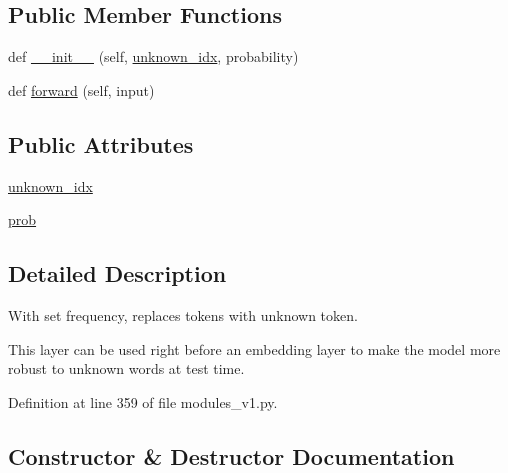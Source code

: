 \subsection*{Public Member Functions}
\begin{DoxyCompactItemize}
\item 
def \hyperlink{classparlai_1_1agents_1_1legacy__agents_1_1seq2seq_1_1modules__v1_1_1UnknownDropout_a7063d1866221608f272c2c6697d4b98b}{\+\_\+\+\_\+init\+\_\+\+\_\+} (self, \hyperlink{classparlai_1_1agents_1_1legacy__agents_1_1seq2seq_1_1modules__v1_1_1UnknownDropout_a7c6fe2c4afa06bf542c36ea9821b243f}{unknown\+\_\+idx}, probability)
\item 
def \hyperlink{classparlai_1_1agents_1_1legacy__agents_1_1seq2seq_1_1modules__v1_1_1UnknownDropout_a4527e73a4211e888db806e4526c0126e}{forward} (self, input)
\end{DoxyCompactItemize}
\subsection*{Public Attributes}
\begin{DoxyCompactItemize}
\item 
\hyperlink{classparlai_1_1agents_1_1legacy__agents_1_1seq2seq_1_1modules__v1_1_1UnknownDropout_a7c6fe2c4afa06bf542c36ea9821b243f}{unknown\+\_\+idx}
\item 
\hyperlink{classparlai_1_1agents_1_1legacy__agents_1_1seq2seq_1_1modules__v1_1_1UnknownDropout_a7d5b061b69c0857aec6dfe3f3f5cd9ed}{prob}
\end{DoxyCompactItemize}


\subsection{Detailed Description}
\begin{DoxyVerb}With set frequency, replaces tokens with unknown token.

This layer can be used right before an embedding layer to make the model
more robust to unknown words at test time.
\end{DoxyVerb}
 

Definition at line 359 of file modules\+\_\+v1.\+py.



\subsection{Constructor \& Destructor Documentation}
\mbox{\label{classparlai_1_1agents_1_1legacy__agents_1_1seq2seq_1_1modules__v1_1_1UnknownDropout_a7063d1866221608f272c2c6697d4b98b}} 

